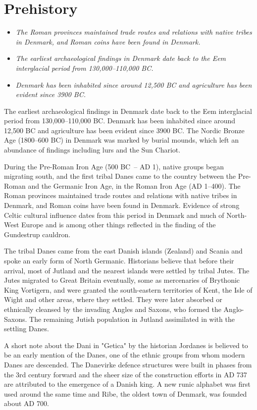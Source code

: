 \section{Prehistory}\label{prehistory}

\begin{itemize}
\item
  \emph{The Roman provinces maintained trade routes and relations with
  native tribes in Denmark, and Roman coins have been found in Denmark.}
\item
  \emph{The earliest archaeological findings in Denmark date back to the
  Eem interglacial period from 130,000--110,000 BC.}
\item
  \emph{Denmark has been inhabited since around 12,500 BC and
  agriculture has been evident since 3900 BC.}
\end{itemize}

The earliest archaeological findings in Denmark date back to the Eem
interglacial period from 130,000--110,000 BC. Denmark has been inhabited
since around 12,500 BC and agriculture has been evident since 3900 BC.
The Nordic Bronze Age (1800--600 BC) in Denmark was marked by burial
mounds, which left an abundance of findings including lurs and the Sun
Chariot.

During the Pre-Roman Iron Age (500 BC~-- AD 1), native groups began
migrating south, and the first tribal Danes came to the country between
the Pre-Roman and the Germanic Iron Age, in the Roman Iron Age (AD
1--400). The Roman provinces maintained trade routes and relations with
native tribes in Denmark, and Roman coins have been found in Denmark.
Evidence of strong Celtic cultural influence dates from this period in
Denmark and much of North-West Europe and is among other things
reflected in the finding of the Gundestrup cauldron.

The tribal Danes came from the east Danish islands (Zealand) and Scania
and spoke an early form of North Germanic. Historians believe that
before their arrival, most of Jutland and the nearest islands were
settled by tribal Jutes. The Jutes migrated to Great Britain eventually,
some as mercenaries of Brythonic King Vortigern, and were granted the
south-eastern territories of Kent, the Isle of Wight and other areas,
where they settled. They were later absorbed or ethnically cleansed by
the invading Angles and Saxons, who formed the Anglo-Saxons. The
remaining Jutish population in Jutland assimilated in with the settling
Danes.

A short note about the Dani in "Getica" by the historian Jordanes is
believed to be an early mention of the Danes, one of the ethnic groups
from whom modern Danes are descended. The Danevirke defence structures
were built in phases from the 3rd century forward and the sheer size of
the construction efforts in AD 737 are attributed to the emergence of a
Danish king. A new runic alphabet was first used around the same time
and Ribe, the oldest town of Denmark, was founded about AD 700.

